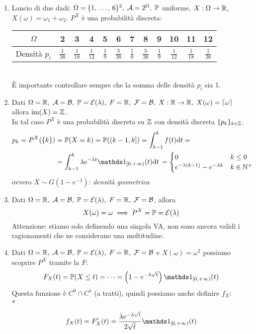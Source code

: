 \begin{enumerate}
  \item Lancio di due dadi: $\Omega = \{1,\, \dots, \, 6\}^2, \; \mathcal A = 2^\Omega, \; \mathbb P$ uniforme, $X:\Omega \to \mathbb R$, $X(\omega) = \omega_1 + \omega_2$. $P^X$ è una probabilità discreta:
    \begin{table}[H]
      \def\arraystretch{1.5}
      \centering
      \begin{tabular}{|c|c|c|c|c|c|c|c|c|c|c|c|}
      \hline
      $\Omega$ & 2 & 3 & 4 & 5 & 6 & 7 & 8 & 9 & 10 & 11 & 12 \\ \hline
      Densità $p_i$ & $\frac{1}{36}$ & $\frac{1}{18}$ & $\frac{1}{12}$ & $\frac{1}{9}$ & $\frac{5}{36}$ & $\frac{1}{6}$ & $\frac{5}{36}$ & $\frac{1}{9}$ & $\frac{1}{12}$ & $\frac{1}{18}$ & $\frac{1}{36}$ \\ \hline
      \end{tabular}
    \end{table}
    ~\\[-25pt]
    È importante controllare sempre che la somma delle densità $p_i$ sia 1.

  \item Dati $\Omega = \mathbb R, \; \mathcal A = \mathcal B, \; \mathbb P = \mathcal E(\lambda), \; F = \mathbb R,  \; \mathcal F = \mathcal B, \; X:\mathbb R \to \mathbb R, \; X(\omega) = \lceil\omega\rceil$ allora $\operatorname{im}(X) = \mathbb Z$. \\
    In tal caso $P^X$ è una probabilità discreta su $\mathbb Z$ con densità discreta $\{p_k\}_{k \in \mathbb Z}$.
    \begin{align*}
      p_k = P^X(\{k\}) &= \PP(X = k) = \PP((k-1, k]) = \int_{k-1}^{k}f(t) \de t =\\
      &= \int_{k-1}^{k} \lambda e^{-\lambda t} \Ind_{[0,+\infty)}(t) \de t \, = \begin{cases} 0 & k \leq 0  \\ e^{-\lambda(k-1)}  - e^{-\lambda k} & k \in \NN^+\end{cases}\\
    \end{align*}
    ovvero $X \sim G(1-e^{-\lambda})$: \textit{densità geometrica}
  \item Dati $\Omega = \mathbb R, \; \mathcal A = \mathcal B, \; \mathbb P = \mathcal E(\lambda), \; F = \mathbb R,  \; \mathcal F = \mathcal B$, allora
    $$X(\omega) = \omega \implies P^X = \mathbb P = \mathcal E(\lambda)$$
    Attenzione: stiamo solo definendo una singola VA, non sono ancora validi i ragionamenti che ne considerano una moltitudine.
  \item Dati $\Omega = \mathbb R, \; \mathcal A = \mathcal B, \; \mathbb P = \mathcal E(\lambda), \; F = \mathbb R,  \; \mathcal F = \mathcal B$ e $X(\omega) = \omega^2$ possiamo scoprire $P^X$ tramite la $F$:
    $$F_X(t) = \PP(X \leq t) = \cdots = \left(1-e^{-\lambda \sqrt{t}}\right) \Ind_{[0, +\infty)}(t)$$
    Questa funzione è $C^0 \cap C^1$ (a tratti), quindi possiamo anche definire $f_X$:\\*
    $$f_X(t) = F'_X (t) = \frac{\lambda e^{-\lambda \sqrt{t}}}{2 \sqrt{t}} \Ind_{[0, +\infty)}(t)$$
\end{enumerate}

